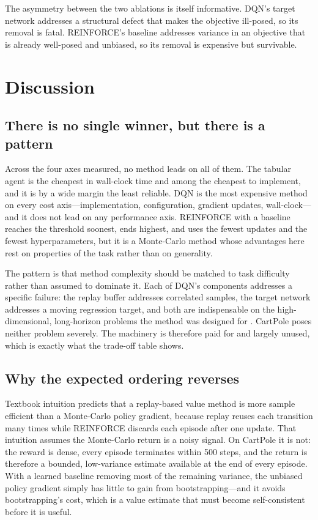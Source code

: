 \documentclass[conference]{IEEEtran}
\begin{document}
The asymmetry between the two ablations is itself informative. DQN's target
network addresses a structural defect that makes the objective ill-posed, so its
removal is fatal. REINFORCE's baseline addresses variance in an objective that is
already well-posed and unbiased, so its removal is expensive but survivable.

\section{Discussion}

\subsection{There is no single winner, but there is a pattern}

Across the four axes measured, no method leads on all of them. The tabular agent
is the cheapest in wall-clock time and among the cheapest to implement, and it is
by a wide margin the least reliable. DQN is the most expensive method on every
cost axis---implementation, configuration, gradient updates, wall-clock---and it
does not lead on any performance axis. REINFORCE with a baseline reaches the
threshold soonest, ends highest, and uses the fewest updates and the fewest
hyperparameters, but it is a Monte-Carlo method whose advantages here rest on
properties of the task rather than on generality.

The pattern is that method complexity should be matched to task difficulty rather
than assumed to dominate it. Each of DQN's components addresses a specific
failure: the replay buffer addresses correlated samples, the target network
addresses a moving regression target, and both are indispensable on the
high-dimensional, long-horizon problems the method was designed for
\cite{mnih2015}. CartPole poses neither problem severely. The machinery is
therefore paid for and largely unused, which is exactly what the trade-off table
shows.

\subsection{Why the expected ordering reverses}

Textbook intuition predicts that a replay-based value method is more sample
efficient than a Monte-Carlo policy gradient, because replay reuses each
transition many times while REINFORCE discards each episode after one update.
That intuition assumes the Monte-Carlo return is a noisy signal. On CartPole it
is not: the reward is dense, every episode terminates within 500 steps, and the
return is therefore a bounded, low-variance estimate available at the end of every
episode. With a learned baseline removing most of the remaining variance, the
unbiased policy gradient simply has little to gain from bootstrapping---and it
avoids bootstrapping's cost, which is a value estimate that must become
self-consistent before it is useful.
\end{document}
